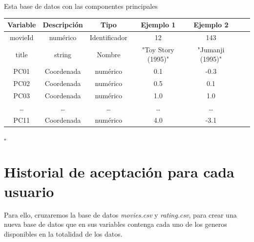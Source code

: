 \begin{db}\label{movierefPCA}
    Esta base de datos con las componentes principales
    \begin{center}
        \begin{tabular}{|c|c|c|c|c|c|c|}
        \hline
        \textbf{Variable} & \textbf{Descripción} & \textbf{Tipo} & \textbf{Ejemplo 1} & \textbf{Ejemplo 2} \\ 
        \hline
        movieId & numérico   & Identificador &    12 &  143     \\
        \hline
        title   & string     & Nombre &    "Toy Story (1995)" &  "Jumanji (1995)"     \\
        \hline
        PC01  & Coordenada & numérico &  0.1 &  -0.3      \\
        PC02  & Coordenada & numérico &  0.5 &  0.1     \\
        PC03  & Coordenada & numérico &  1.0 &  1.0      \\
        \dots & \dots                     &  \dots &  \dots &  \dots    \\        PC11  & Coordenada & numérico &  4.0 &  -3.1      \\
       \hline
        \end{tabular}
    \end{center}
    \hfill $\square$
\end{db}


\section{Historial de aceptación para cada usuario}


Para ello, cruzaremos la base de datos \emph{movies.csv} y \emph{rating.csv}, para crear una nueva base de datos que en sus variables contenga cada uno de los generos disponibles en la totalidad de los datos. 

